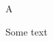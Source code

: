 \documentclass{artikel3}
\begin{document}
\begin{figure}
\centering A
\caption{Some text}
\end{figure}
\end{document}
